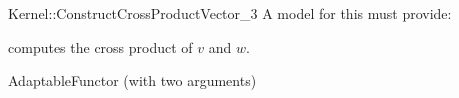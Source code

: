\begin{ccRefFunctionObjectConcept}{Kernel::ConstructCrossProductVector_3}
A model for this must provide:



            {computes the cross product of $v$ and $w$.}

\ccRefines
AdaptableFunctor (with two arguments)

\ccSeeAlso

\\

\end{ccRefFunctionObjectConcept}
